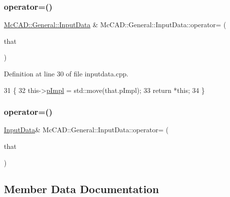 \subsubsection{\texorpdfstring{operator=()}{operator=()}\hspace{0.1cm}{\footnotesize\ttfamily [3/4]}}
{\footnotesize\ttfamily \hyperlink{classMcCAD_1_1General_1_1InputData}{Mc\+C\+A\+D\+::\+General\+::\+Input\+Data} \& Mc\+C\+A\+D\+::\+General\+::\+Input\+Data\+::operator= (\begin{DoxyParamCaption}\item[{\hyperlink{classMcCAD_1_1General_1_1InputData}{Input\+Data} \&\&}]{that }\end{DoxyParamCaption})}



Definition at line 30 of file inputdata.\+cpp.


\begin{DoxyCode}
31                          \{
32     this->\hyperlink{classMcCAD_1_1General_1_1InputData_a6a636f3d471d293dcb12c59d29af50c9}{pImpl} = std::move(that.pImpl);
33     \textcolor{keywordflow}{return} *\textcolor{keyword}{this};
34 \}
\end{DoxyCode}
\mbox{\label{classMcCAD_1_1General_1_1InputData_a4244ba00ba89c814c7607c4c7fd9fc91}} 
\subsubsection{\texorpdfstring{operator=()}{operator=()}\hspace{0.1cm}{\footnotesize\ttfamily [4/4]}}
{\footnotesize\ttfamily \hyperlink{classMcCAD_1_1General_1_1InputData}{Input\+Data}\& Mc\+C\+A\+D\+::\+General\+::\+Input\+Data\+::operator= (\begin{DoxyParamCaption}\item[{\hyperlink{classMcCAD_1_1General_1_1InputData}{Input\+Data} \&\&}]{that }\end{DoxyParamCaption})}



\subsection{Member Data Documentation}
\mbox{\label{classMcCAD_1_1General_1_1InputData_a6a636f3d471d293dcb12c59d29af50c9}} 
